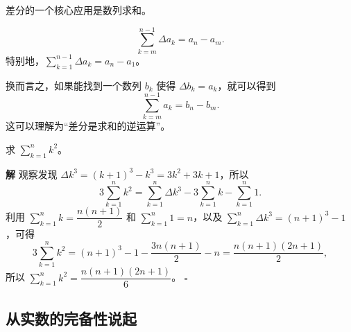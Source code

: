 \documentclass[fontset=fandol]{ctexart}
\newenvironment{solution}{\par\noindent\textbf{解}\quad}{\hfill$\square$\par\vspace{0.8em}}
\begin{document}
差分的一个核心应用是数列求和。

\begin{theorem}
\[
\sum _{k=m}^{n-1} \Delta a_k = a_n - a_m.
\]
特别地，\(\sum_{k=1}^{n-1} \Delta a_k = a_n - a_1\)。
\end{theorem}

换而言之，如果能找到一个数列 \(b_k\) 使得 \(\Delta b_k=a_k\)，就可以得到
\[
\sum_{k=m}^{n-1}a_k=b_n-b_m.
\]
这可以理解为“差分是求和的逆运算”。

\begin{example}[求自然数平方和]
求 \(\sum_{k=1}^n k^2\)。
\end{example}

\begin{solution}
观察发现 \(\Delta k^3 = (k+1)^3 - k^3 = 3k^2 + 3k + 1\)，所以
\[
3\sum_{k=1}^n k^2 = \sum_{k=1}^n \Delta k^3 - 3\sum_{k=1}^n k - \sum_{k=1}^n 1.
\]
利用 \(\sum_{k=1}^n  k = \dfrac{n(n+1)}{2}\) 和 \(\sum_{k=1}^n  1 = n\)，以及 \(\sum_{k=1}^n  \Delta k^3 = (n+1)^3 - 1\)，可得
\[
3\sum_{k=1}^n  k^2 = (n+1)^3 - 1 - \dfrac{3n(n+1)}{2} - n = \dfrac{n(n+1)(2n+1)}{2},
\]
所以 \(\sum_{k=1}^n k^2 = \dfrac{n(n+1)(2n+1)}{6}\)。
\end{solution}

\iffalse
\subsection{从实数的完备性说起}
\end{document}

